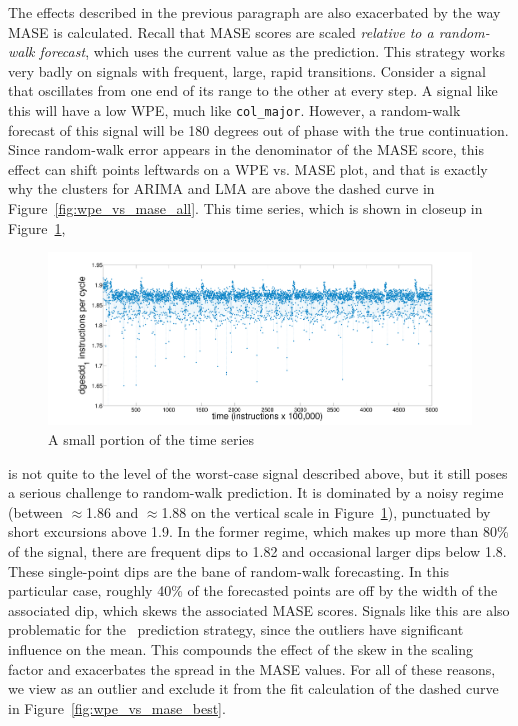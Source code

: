 The effects described in the previous paragraph are also exacerbated
by the way MASE is calculated.  Recall that MASE scores are scaled
\emph{relative to a random-walk forecast}, which uses the current
value as the prediction.  This strategy works very badly on signals
with frequent, large, rapid transitions.  Consider a signal that
oscillates from one end of its range to the other at every step.  A
signal like this will have a low WPE, much like {\tt col\_major}.
However, a random-walk forecast of this signal will be 180 degrees out
of phase with the true continuation.  Since random-walk error appears
in the denominator of the MASE score, this effect can shift points
leftwards on a WPE vs. MASE plot, and that is exactly why the \svdone
clusters for ARIMA and LMA are above the dashed curve in
Figure~\ref{fig:wpe_vs_mase_all}.  This time series, which is shown in
closeup in Figure~\ref{fig:svdone-ts},
\begin{figure}[htbp]
  \centering
    \includegraphics[width=\columnwidth]{figs/svdonets2}
\caption{A small portion of the \svdone time series}\label{fig:svdone-ts}
\end{figure}
is not quite to the level of the worst-case signal described above,
but it still poses a serious challenge to random-walk prediction.  It
is dominated by a noisy regime (between $\approx$1.86 and
$\approx$1.88 on the vertical scale in Figure~\ref{fig:svdone-ts}),
punctuated by short excursions above 1.9.  In the former regime, which
makes up more than 80\% of the signal, there are frequent dips to 1.82
and occasional larger dips below 1.8.  These single-point dips are the
bane of random-walk forecasting.  In this particular case, roughly
40\% of the forecasted points are off by the width of the associated
dip, which skews the associated MASE scores.  Signals like this are
also problematic for the \naive ~prediction strategy, since the
outliers have significant influence on the mean.  This compounds the
effect of the skew in the scaling factor and exacerbates the spread in
the \svdone MASE values.  For all of these reasons, we view \svdone as
an outlier and exclude it from the fit calculation of the dashed curve
in Figure~\ref{fig:wpe_vs_mase_best}.

